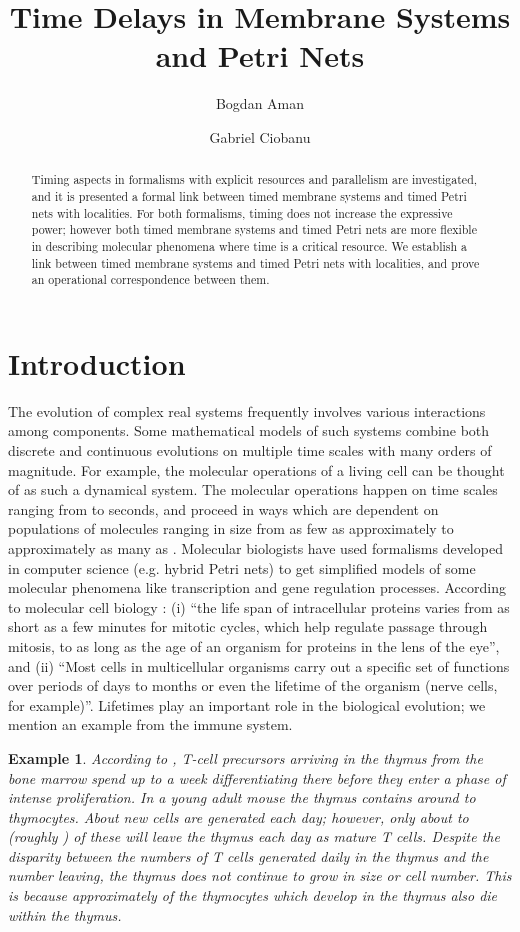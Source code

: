\documentclass{eptcs}
\title{Time Delays in Membrane Systems and Petri Nets}
\author{Bogdan Aman
\institute{A.I.Cuza University\\
Blvd. Carol I, no.11, 700506 Ia\c si, Romania}
\email{bogdan.aman@gmail.com}
\and Gabriel Ciobanu
\institute{Institute of Computer Science, Romanian Academy\\
and ''A.I.~Cuza'' University of Ia\c si, Romania}
\email{gabriel@info.uaic.ro} }
\newtheorem{example}{Example}
\begin{document}
\maketitle

\begin{abstract}

Timing aspects in formalisms with explicit resources and parallelism are
investigated, and it is presented a formal link between timed membrane systems
and timed Petri nets with localities. For both formalisms, timing does not
increase the expressive power; however both timed membrane systems and timed
Petri nets are more flexible in describing molecular phenomena where time is a
critical resource. We establish a link between timed membrane systems and timed
Petri nets with localities, and prove an operational correspondence between
them.

\end{abstract}

\section{Introduction}
\label{section:introduction}

The evolution of complex real systems frequently involves various
interactions among components. Some mathematical models of such systems
combine both discrete and continuous evolutions on multiple time scales
with many orders of magnitude. For example, the molecular operations of a
living cell can be thought of as such a dynamical system. The molecular
operations happen on time scales ranging from  to  seconds,
and proceed in ways which are dependent on populations of molecules ranging
in size from as few as approximately  to approximately as many as
. Molecular biologists have used formalisms developed in computer
science (e.g. hybrid Petri nets) to get simplified models of some molecular
phenomena like transcription and gene regulation processes. According to
molecular cell biology \cite{Lodish08}:
(i) ``the life span of intracellular proteins varies from as
short as a few minutes for mitotic cycles, which help regulate
passage through mitosis, to as long as the age of an organism for
proteins in the lens of the eye'', and
(ii) ``Most cells in multicellular organisms  carry
out a specific set of functions over periods of days to months or
even the lifetime of the organism (nerve cells, for example)''.
Lifetimes play an important role in the
biological evolution; we mention an example from the immune system.
\begin{example}
According to \cite{Lodish08}, T-cell precursors arriving in the thymus from
the bone marrow spend up to a week differentiating there before they enter
a phase of intense proliferation. In a young adult mouse the thymus
contains around  to  thymocytes. About 
new cells are generated each day; however, only about  to  (roughly ) of these will leave the thymus each day as mature T
cells. Despite the disparity between the numbers of T cells generated daily
in the thymus and the number leaving, the thymus does not continue to grow
in size or cell number. This is because approximately  of the
thymocytes which develop in the thymus also die within the thymus.
\end{example}
\end{document}
